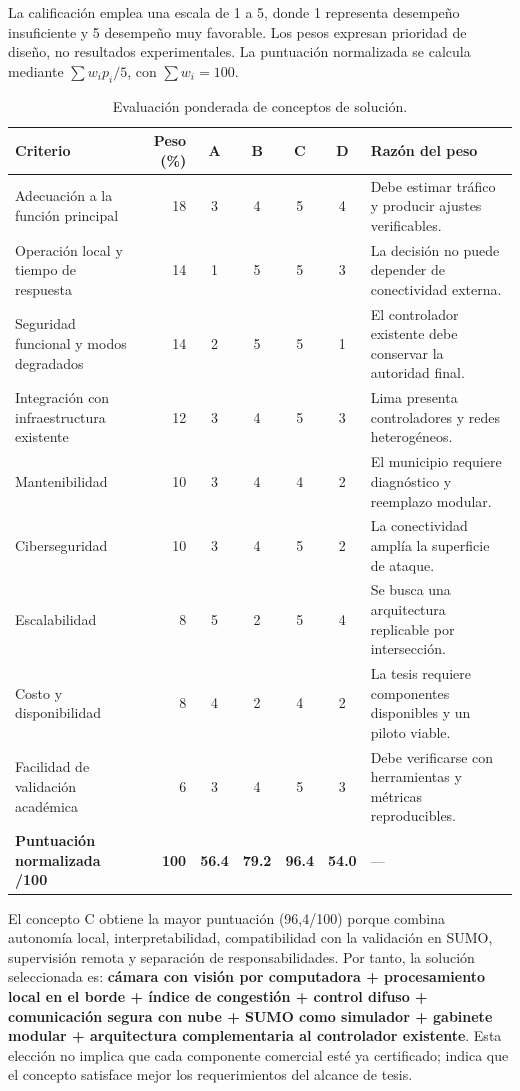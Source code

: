 La calificación emplea una escala de 1 a 5, donde 1 representa desempeño insuficiente y 5 desempeño muy
favorable. Los pesos expresan prioridad de diseño, no resultados experimentales. La puntuación normalizada se
calcula mediante $\sum w_i p_i/5$, con $\sum w_i = 100$.

\begin{landscape}
\begin{table}[H]
\centering
\footnotesize
\caption{Evaluación ponderada de conceptos de solución.}\label{tab:evaluacion-conceptos}
\begin{tabular}{@{}p{5.0cm}rccccp{5.0cm}@{}}
\toprule
\textbf{Criterio} & \textbf{Peso (\%)} & \textbf{A} & \textbf{B} & \textbf{C} & \textbf{D} & \textbf{Razón del peso}\\
\midrule
Adecuación a la función principal & 18 & 3 & 4 & 5 & 4 & Debe estimar tráfico y producir ajustes verificables.\\
Operación local y tiempo de respuesta & 14 & 1 & 5 & 5 & 3 & La decisión no puede depender de conectividad externa.\\
Seguridad funcional y modos degradados & 14 & 2 & 5 & 5 & 1 & El controlador existente debe conservar la autoridad final.\\
Integración con infraestructura existente & 12 & 3 & 4 & 5 & 3 & Lima presenta controladores y redes heterogéneos.\\
Mantenibilidad & 10 & 3 & 4 & 4 & 2 & El municipio requiere diagnóstico y reemplazo modular.\\
Ciberseguridad & 10 & 3 & 4 & 5 & 2 & La conectividad amplía la superficie de ataque.\\
Escalabilidad & 8 & 5 & 2 & 5 & 4 & Se busca una arquitectura replicable por intersección.\\
Costo y disponibilidad & 8 & 4 & 2 & 4 & 2 & La tesis requiere componentes disponibles y un piloto viable.\\
Facilidad de validación académica & 6 & 3 & 4 & 5 & 3 & Debe verificarse con herramientas y métricas reproducibles.\\
\midrule
\textbf{Puntuación normalizada /100} & \textbf{100} & \textbf{56.4} & \textbf{79.2} & \textbf{96.4} & \textbf{54.0} & ---\\
\bottomrule
\end{tabular}
\end{table}
\end{landscape}

El concepto C obtiene la mayor puntuación (96,4/100) porque combina autonomía local, interpretabilidad,
compatibilidad con la validación en SUMO, supervisión remota y separación de responsabilidades. Por tanto, la
solución seleccionada es: \textbf{cámara con visión por computadora + procesamiento local en el borde + índice
de congestión + control difuso + comunicación segura con nube + SUMO como simulador + gabinete modular +
arquitectura complementaria al controlador existente}. Esta elección no implica que cada componente comercial
esté ya certificado; indica que el concepto satisface mejor los requerimientos del alcance de tesis.

